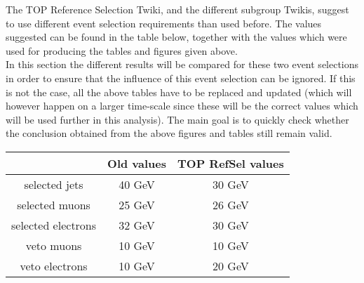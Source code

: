 \documentclass[a4paper,12pt]{report}
\begin{document}
The TOP Reference Selection Twiki, and the different subgroup Twikis, suggest to use different event selection requirements than used before. The values suggested can be found in the table below, together with the values which were used for producing the tables and figures given above.\\
In this section the different results will be compared for these two event selections in order to ensure that the influence of this event selection can be ignored. If this is not the case, all the above tables have to be replaced and updated (which will however happen on a larger time-scale since these will be the correct values which will be used further in this analysis). The main goal is to quickly check whether the conclusion obtained from the above figures and tables still remain valid.
\begin{table}[!h]
 \centering
 \begin{tabular}{c|c|c}
                      & Old values & TOP RefSel values \\
   \hline
   selected jets      &   40 GeV   &       30 GeV      \\
   selected muons     &   25 GeV   &       26 GeV      \\
   selected electrons &   32 GeV   &       30 GeV      \\
   veto muons         &   10 GeV   &       10 GeV      \\
   veto electrons     &   10 GeV   &       20 GeV      
 \end{tabular}
\end{table}
\end{document}
